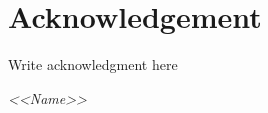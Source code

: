 



\chapter*{Acknowledgement}
\pagestyle{plain}
\thispagestyle{empty}

Write acknowledgment here
\begin{flushright}
	\textit{<<Name>>}
\end{flushright}
